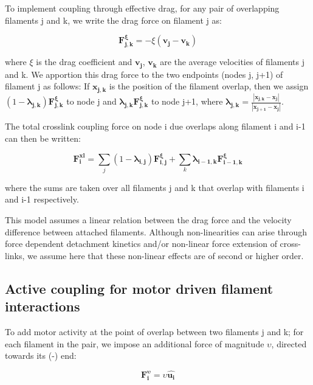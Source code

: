 \documentclass[10pt,letterpaper]{article}
\begin{document}
To implement coupling through effective drag, for any pair of overlapping filaments j and k, we write the drag force on filament j as:

\begin{equation}
\label{eqn:drag force}
\mathbf{F^{\xi}_{j,k}} = -\xi  (\mathbf{v_{j}}-\mathbf{v_{k}}) 
\end{equation}

where $\xi$ is the drag coefficient and $\mathbf{v_{j}}$, $\mathbf{v_{k}}$ are the average velocities of filaments j and k. We apportion this drag force to the two endpoints (nodes j, j+1) of filament j as follows: If $\mathbf{x_{j,k}}$ is the position of the filament overlap, then we assign $(1 - \mathbf{\lambda_{j,k}}) \mathbf{F^{\xi}_{j,k}}$ to node j and $\mathbf{\lambda_{j,k}} \mathbf{F^{\xi}_{j,k}}$ to node j+1, where $\mathbf{\lambda_{j,k}} = \frac{|\mathbf{x_{j,k}}-\mathbf{x_j}|}{|\mathbf{x_{j+1}}-\mathbf{x_j}|}$.

The total crosslink coupling force on node i due overlaps along filament i and i-1 can then be written:

\begin{equation}
\label{eqn: total drag couple}
\mathbf{F^{xl}_{i}} = \sum_j (1 - \mathbf{\lambda_{i,j}}) \mathbf{F^{\xi}_{i,j}} + \sum_k \mathbf{\lambda_{i-1,k}} \mathbf{F^{\xi}_{i-1,k}}
\end{equation}

where the sums are taken over all filaments j and k that overlap with filaments i and i-1 respectively.  

This model assumes a linear relation between the drag force and the velocity difference between attached filaments.   Although non-linearities can arise through force dependent detachment kinetics and/or non-linear force extension of cross-links, we assume here that these non-linear effects are of second or higher order. 

\subsection*{Active coupling for motor driven filament interactions}

To add motor activity at the point of overlap between two filaments j and k; for each filament in the pair, we impose an additional force of magnitude $\upsilon$, directed towards its (-) end:

\begin{equation}
\label{eqn:directedmotorforce}
\mathbf{F^{\upsilon}_{i}}=\upsilon \mathbf{\hat{u_i}}
\end{equation}
\end{document}
